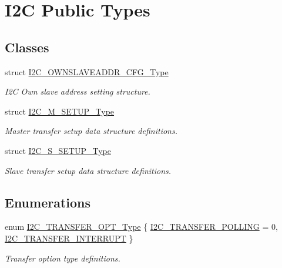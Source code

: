 \hypertarget{group___i2_c___public___types}{}\section{I2C Public Types}
\label{group___i2_c___public___types}
\subsection*{Classes}
\begin{DoxyCompactItemize}
\item 
struct \hyperlink{struct_i2_c___o_w_n_s_l_a_v_e_a_d_d_r___c_f_g___type}{I2\+C\+\_\+\+O\+W\+N\+S\+L\+A\+V\+E\+A\+D\+D\+R\+\_\+\+C\+F\+G\+\_\+\+Type}
\begin{DoxyCompactList}\small\item\em I2C Own slave address setting structure. \end{DoxyCompactList}\item 
struct \hyperlink{struct_i2_c___m___s_e_t_u_p___type}{I2\+C\+\_\+\+M\+\_\+\+S\+E\+T\+U\+P\+\_\+\+Type}
\begin{DoxyCompactList}\small\item\em Master transfer setup data structure definitions. \end{DoxyCompactList}\item 
struct \hyperlink{struct_i2_c___s___s_e_t_u_p___type}{I2\+C\+\_\+\+S\+\_\+\+S\+E\+T\+U\+P\+\_\+\+Type}
\begin{DoxyCompactList}\small\item\em Slave transfer setup data structure definitions. \end{DoxyCompactList}\end{DoxyCompactItemize}
\subsection*{Enumerations}
\begin{DoxyCompactItemize}
\item 
enum \hyperlink{group___i2_c___public___types_gacbdb9912dc18d79d425d9ac7e1333095}{I2\+C\+\_\+\+T\+R\+A\+N\+S\+F\+E\+R\+\_\+\+O\+P\+T\+\_\+\+Type} \{ \hyperlink{group___i2_c___public___types_ggacbdb9912dc18d79d425d9ac7e1333095a705c23545825458561fbfbf83393dc69}{I2\+C\+\_\+\+T\+R\+A\+N\+S\+F\+E\+R\+\_\+\+P\+O\+L\+L\+I\+NG} = 0, 
\hyperlink{group___i2_c___public___types_ggacbdb9912dc18d79d425d9ac7e1333095adcf6aee8de975dd710d711e590f3a753}{I2\+C\+\_\+\+T\+R\+A\+N\+S\+F\+E\+R\+\_\+\+I\+N\+T\+E\+R\+R\+U\+PT}
 \}\begin{DoxyCompactList}\small\item\em Transfer option type definitions. \end{DoxyCompactList}
\end{DoxyCompactItemize}


